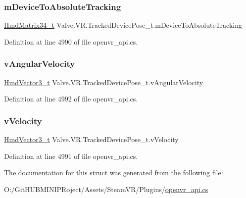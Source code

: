 \subsubsection{\texorpdfstring{mDeviceToAbsoluteTracking}{mDeviceToAbsoluteTracking}}
{\footnotesize\ttfamily \mbox{\hyperlink{struct_valve_1_1_v_r_1_1_hmd_matrix34__t}{Hmd\+Matrix34\+\_\+t}} Valve.\+V\+R.\+Tracked\+Device\+Pose\+\_\+t.\+m\+Device\+To\+Absolute\+Tracking}



Definition at line 4990 of file openvr\+\_\+api.\+cs.

\mbox{\label{struct_valve_1_1_v_r_1_1_tracked_device_pose__t_af0c599e13ad2c8cd9cbcf3d1bc142e53}} 
\subsubsection{\texorpdfstring{vAngularVelocity}{vAngularVelocity}}
{\footnotesize\ttfamily \mbox{\hyperlink{struct_valve_1_1_v_r_1_1_hmd_vector3__t}{Hmd\+Vector3\+\_\+t}} Valve.\+V\+R.\+Tracked\+Device\+Pose\+\_\+t.\+v\+Angular\+Velocity}



Definition at line 4992 of file openvr\+\_\+api.\+cs.

\mbox{\label{struct_valve_1_1_v_r_1_1_tracked_device_pose__t_a1f9f0309ec2f75a9aac22c3e912b99f7}} 
\subsubsection{\texorpdfstring{vVelocity}{vVelocity}}
{\footnotesize\ttfamily \mbox{\hyperlink{struct_valve_1_1_v_r_1_1_hmd_vector3__t}{Hmd\+Vector3\+\_\+t}} Valve.\+V\+R.\+Tracked\+Device\+Pose\+\_\+t.\+v\+Velocity}



Definition at line 4991 of file openvr\+\_\+api.\+cs.



The documentation for this struct was generated from the following file\+:\begin{DoxyCompactItemize}
\item 
O\+:/\+Git\+H\+U\+B\+M\+I\+N\+I\+P\+Roject/\+Assets/\+Steam\+V\+R/\+Plugins/\mbox{\hyperlink{openvr__api_8cs}{openvr\+\_\+api.\+cs}}\end{DoxyCompactItemize}
